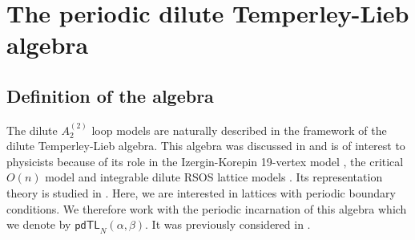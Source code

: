 \documentclass[11pt]{article}
\numberwithin{equation}{section}
\theoremstyle{plain}
\numberwithin{equation}{section}
\begin{document}
\section{The periodic dilute Temperley-Lieb algebra}\label{sec:pdTL}

\subsection{Definition of the algebra} 

The dilute $A^{(2)}_2$ loop models are naturally described in the framework of the dilute Temperley-Lieb algebra. This algebra was discussed in \cite{GP93,P94,U96} and is of interest to physicists because of its role in the Izergin-Korepin 19-vertex model \cite{IK1981}, the critical $O(n)$ model \cite{N90} and integrable dilute RSOS lattice models \cite{WNS1992,R92,WPSN1994}. Its representation theory is studied in \cite{BSA14}. Here, we are interested in lattices with periodic boundary conditions. We therefore work with the periodic incarnation of this algebra which we denote by $\mathsf{pdTL}_N(\alpha,\beta)$. It was previously considered in \cite{G12,MDPR2018}. 
\end{document}
